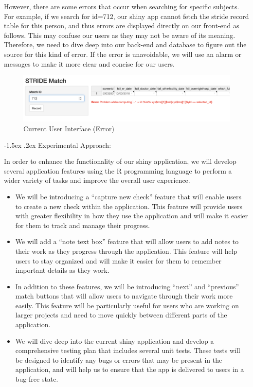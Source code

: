 \documentclass[11pt,]{article}
\makeatletter
\providecommand{\tightlist}{%
  \setlength{\itemsep}{0pt}\setlength{\parskip}{0pt}}
\renewcommand\paragraph{
  \@startsection{paragraph}{4}{\z@}
    {-0.5ex\@plus -1ex \@minus -.2ex}%
    {-1.5ex \@plus .2ex}%
    {\normalfont\normalsize\bf}} %
\makeatother
\begin{document}
However, there are some errors that occur when searching for specific
subjects. For example, if we search for id=712, our shiny app cannot
fetch the stride record table for this person, and thus errors are
displayed directly on our front-end as follows. This may confuse our
users as they may not be aware of its meaning. Therefore, we need to
dive deep into our back-end and database to figure out the source for
this kind of error. If the error is unavoidable, we will use an alarm or
messages to make it more clear and concise for our users.

\begin{figure}[h]
\begin{center}
\includegraphics[width=\textwidth]{ui-2.png} 
\caption{Current User Interface (Error)}\label{fig:unnamed-chunk-2}
\end{center}
\end{figure}

\paragraph{Experimental Approach:}\label{experimental-approach}

In order to enhance the functionality of our shiny application, we will
develop several application features using the R programming language to
perform a wider variety of tasks and improve the overall user
experience.

\begin{itemize}
\tightlist
\item
  We will be introducing a ``capture new check'' feature that will
  enable users to create a new check within the application. This
  feature will provide users with greater flexibility in how they use
  the application and will make it easier for them to track and manage
  their progress.
\item
  We will add a ``note text box'' feature that will allow users to add
  notes to their work as they progress through the application. This
  feature will help users to stay organized and will make it easier for
  them to remember important details as they work.
\item
  In addition to these features, we will be introducing ``next'' and
  ``previous'' match buttons that will allow users to navigate through
  their work more easily. This feature will be particularly useful for
  users who are working on larger projects and need to move quickly
  between different parts of the application.
\item
  We will dive deep into the current shiny application and develop a
  comprehensive testing plan that includes several unit tests. These
  tests will be designed to identify any bugs or errors that may be
  present in the application, and will help us to ensure that the app is
  delivered to users in a bug-free state.
\end{itemize}
\end{document}
